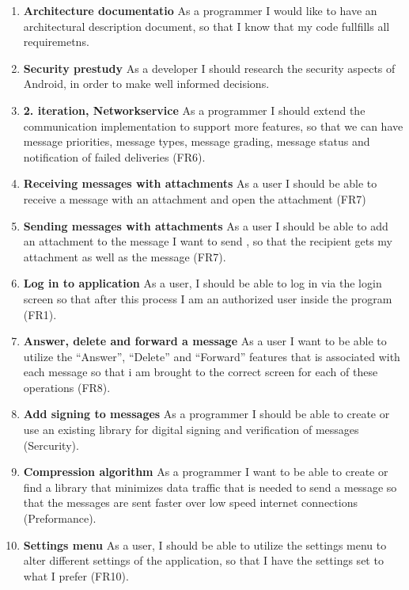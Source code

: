\begin{enumerate}
			\item {\bf Architecture documentatio} As a programmer I would like to have an architectural description document, so that I know that my code fullfills all requiremetns.
			\item {\bf Security prestudy} As a developer I should research the security aspects of Android, in order to make well informed decisions.
			\item {\bf 2. iteration, Networkservice} As a programmer I should extend the communication implementation to support more features, so that we can have message priorities, message types, message grading, message status and notification of failed deliveries (FR6).
			\item {\bf Receiving messages with attachments} As a user I should be able to receive a message with an attachment and open the attachment (FR7)
			\item {\bf Sending messages with attachments} As a user I should be able to add an attachment to the message I want to send , so that the recipient gets my attachment as well as the message (FR7). 
			\item {\bf Log in to application} As a user, I should be able to log in via the login screen so that after this process I am an authorized user inside the program (FR1).
			\item {\bf Answer, delete and forward a message} As a user I want to be able to utilize the ``Answer'', ``Delete'' and ``Forward'' features that is associated with each message so that i am brought to the correct screen for each of these operations (FR8).
			\item {\bf Add signing to messages} As a programmer I should be able to create or use an existing library for digital signing and verification of messages (Sercurity).
			\item {\bf Compression algorithm} As a programmer I want to be able to create or find a library that minimizes data traffic that is needed to send a message so that the messages are sent faster over low speed internet connections (Preformance).
			\item {\bf Settings menu} As a user, I should be able to utilize the settings menu to alter different settings of the application, so that I have the settings set to what I prefer (FR10).
			
			
			

\end{enumerate}
